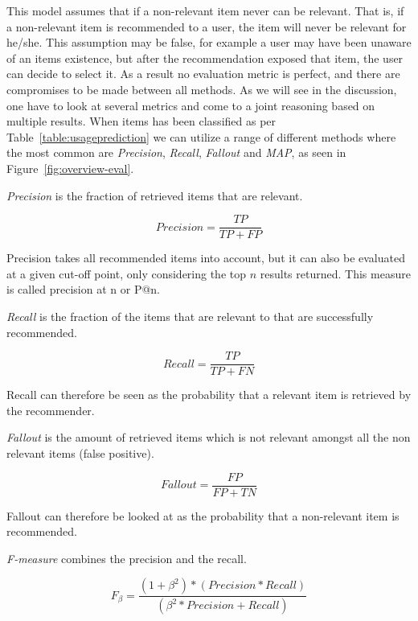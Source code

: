 This model assumes that if a non-relevant item never can be relevant. That is,
if a non-relevant item is recommended to a user, the item will never be
relevant for he/she. This assumption may be false, for example a user may
have been unaware of an items existence, but after the recommendation exposed
that item, the user can decide to select it. As a result no evaluation metric
is perfect, and there are compromises to be made between all methods. As we
will see in the discussion, one have to look at several metrics and come to a
joint reasoning based on multiple results. When items has been classified as
per Table~\ref{table:usageprediction} we can utilize a range of different
methods where the most common are \textit{Precision}, \textit{Recall},
\textit{Fallout} and \textit{MAP}, as seen in Figure~\ref{fig:overview-eval}.

\textit{Precision} is the fraction of retrieved items that are relevant.

\begin{equation}
    Precision = \frac{TP}{TP+FP}
    \label{equation:precision}
\end{equation}

Precision takes all recommended items into account, but it can also be
evaluated at a given cut-off point, only considering the top $n$ results
returned. This measure is called precision at n or P@n.

\textit{Recall} is the fraction of the items that are relevant to that are
successfully recommended.

\begin{equation}
    Recall = \frac{TP}{TP+FN}
    \label{equation:recall}
\end{equation}

Recall can therefore be seen as the probability that a relevant item is
retrieved by the recommender.

\textit{Fallout} is the amount of retrieved items which is not relevant amongst
all the non relevant items (false positive).

\begin{equation}
    Fallout = \frac{FP}{FP+TN}
    \label{equation:fallout}
\end{equation}

Fallout can therefore be looked at as the probability that a non-relevant item
is recommended.

\textit{F-measure} combines the precision and the recall.

\begin{equation}
    F_\beta = \frac{(1 + \beta^2) * (Precision * Recall)}{(\beta^2 * Precision + Recall)}
    \label{equation:f-measure}
\end{equation}

